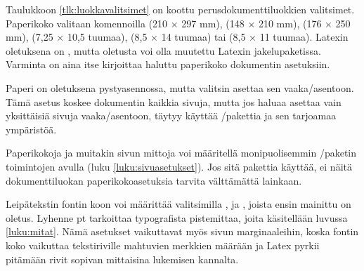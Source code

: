 Taulukkoon \ref{tlk:luokkavalitsimet}%
 on koottu perusdokumenttiluokkien valitsimet.
Paperikoko valitaan komennoilla  (210 × 297 mm),
 (148 × 210 mm),  (176 × 250 mm),
 (7,25 × 10,5 tuumaa),  (8,5 ×
14 tuumaa) tai  (8,5 × 11 tuumaa). Latexin oletuksena
on , mutta oletusta voi olla muutettu Latexin
jakelupaketissa. Varminta on aina itse kirjoittaa haluttu paperikoko
dokumentin asetuksiin.


Paperi%
 on oletuksena pysty\-asen\-nossa, mutta valitsin
 asettaa sen vaaka\-/asentoon. Tämä asetus koskee
dokumentin kaikkia sivuja, mutta jos haluaa asettaa vain yksittäisiä
sivuja vaaka\-/asentoon, täytyy käyttää \-/pakettia
ja sen tarjoamaa ympäristöä.

Paperikokoja ja muitakin sivun mittoja voi määritellä monipuolisemmin
\-/paketin toimintojen avulla (luku
\ref{luku:sivuasetukset}). Jos sitä pakettia käyttää, ei näitä
dokumenttiluokan paperi\-koko\-ase\-tuk\-sia tarvita välttämättä
lainkaan.

Leipätekstin%
\koodimargin{10pt \\ 11pt \\ 12pt} fontin koon voi määrittää
valitsimilla \koodi{10pt}, \koodi{11pt} ja \koodi{12pt}, joista ensin
mainittu on oletus. Lyhenne pt tarkoittaa typografista pistemittaa,
joita käsitellään luvussa \ref{luku:mitat}. Nämä asetukset vaikuttavat
myös sivun marginaaleihin, koska fontin koko vaikuttaa tekstiriville
mahtuvien merkkien määrään ja Latex pyrkii pitämään rivit sopivan
mittaisina lukemisen kannalta.

